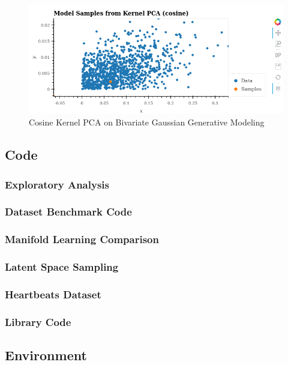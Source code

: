 \documentclass[12pt]{article}
\begin{document}
\begin{figure}[!hb]
\includegraphics[scale = 0.3]{../../media/04-generative-kpca.png}
    \caption{Cosine Kernel PCA on Bivariate Gaussian Generative Modeling}
    \label{fig:generative-kpca}
\end{figure}
\newpage



\newpage
\subsection{Code}
\nocite{Basquin2018, Scipy, scikit-learn}
\subsubsection{Exploratory Analysis}

\subsubsection{Dataset Benchmark Code}

\subsubsection{Manifold Learning Comparison}

\subsubsection{Latent Space Sampling}

\subsubsection{Heartbeats Dataset}

\subsubsection{Library Code}






\newpage
\subsection{Environment}




\end{document}

